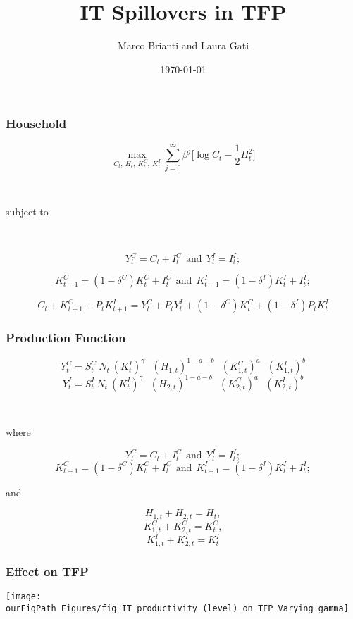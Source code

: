\documentclass{beamer}
\author[Brianti, Gati]{Marco Brianti and Laura Gati}
\institute[Boston College]{Boston College}
\title{IT Spillovers in TFP }
\date{\today}
\def \ourFigPath {../../}
\begin{document}
\begin{frame}

\maketitle


\end{frame}

\begin{frame}
\frametitle{Household}

$$
\max_{C_t, \ H_t, \ K_t^C, \ K_t^I} \sum_{j=0}^{\infty} \beta^j \bigg[ \log C_t -  \frac{1}{2} H_t^2 \bigg]
$$

\

subject to

\


$$
Y^C_t = C_t + I^C_t \ \ \text{and} \ \ Y_t^I = I^I_t;
$$


$$
K^C_{t+1} = (1 - \delta^C)K^C_t + I^C_t \ \ \text{and} \ \ K^I_{t+1} = (1 - \delta^I)K^I_t + I^I_t;
$$


$$
C_t + K^C_{t+1} + P_t K^I_{t+1} = Y^C_t + P_t Y^I_t + (1 - \delta^C)K^C_t + (1 - \delta^I)P_t K^I_t
$$


\end{frame}

\begin{frame}
\frametitle{Production Function}

$$
Y^C_t = S_t^C \  N_t \ (K^I_t)^{\gamma} \ \ \  (H_{1,t})^{1-a-b} \ \ \  (K_{1,t}^C)^{a} \ \ \ (K_{1,t}^I)^{b}
$$
$$
Y^I_t = S_t^I \  N_t \ (K^I_t)^{\gamma} \ \ \  (H_{2,t})^{1-a-b} \ \ \  (K_{2,t}^C)^{a} \ \ \ (K_{2,t}^I)^{b}
$$

\


where

$$
Y^C_t = C_t + I^C_t \ \ \text{and} \ \ Y_t^I = I^I_t;
$$
$$
K^C_{t+1} = (1 - \delta^C)K^C_t + I^C_t \ \ \text{and} \ \ K^I_{t+1} = (1 - \delta^I)K^I_t + I^I_t;
$$

and


$$
H_{1,t} + H_{2,t} = H_t, 
$$
$$
K_{1,t}^C + K_{2,t}^C = K_t^C, 
$$
$$
K_{1,t}^I + K_{2,t}^I = K_t^I
$$





\end{frame}


\begin{frame}
\frametitle{Effect on TFP}

\begin{center}
	\texttt{[image: \\ourFigPath Figures/fig\_IT\_productivity\_(level)\_on\_TFP\_Varying\_gamma]}
\end{center}


\end{frame}
\end{document}
